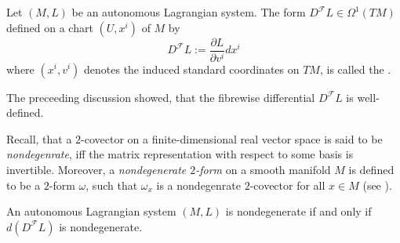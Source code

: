 \begin{definition}
	\label{def:fibrewise_differential}
	Let $(M,L)$ be an autonomous Lagrangian system. The form $D^\mathcal{F}L \in \Omega^1(TM)$ defined on a chart $(U,x^i)$ of $M$ by
	\begin{equation}
		\label{eq:fibrewise_differential}
		D^\mathcal{F}L := \frac{\partial L}{\partial v^i}dx^i
	\end{equation}
	\noindent where $(x^i,v^i)$ denotes the induced standard coordinates on $TM$, is called the .
\end{definition}

\begin{remark}
	The preceeding discussion showed, that the fibrewise differential $D^\mathcal{F}L$ is well-defined.
\end{remark}

Recall, that a $2$-covector on a finite-dimensional real vector space is said to be \emph{nondegenrate}, iff the matrix representation with respect to some basis is invertible. Moreover, a \emph{nondegenerate $2$-form} on a smooth manifold $M$ is defined to be a $2$-form $\omega$, such that $\omega_x$ is a nondegenrate $2$-covector for all $x \in M$ (see \cite[565,567]{lee:smooth_manifolds:2013}). 

\begin{proposition}
	An autonomous Lagrangian system $(M,L)$ is nondegenerate if and only if $d(D^\mathcal{F}L)$ is nondegenerate.
\end{proposition}

